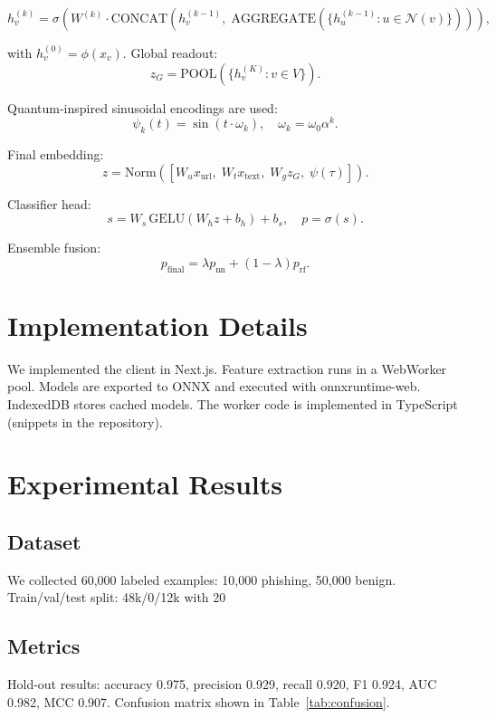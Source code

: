 \documentclass[conference]{IEEEtran}
\begin{document}
\begin{equation}
\label{eq:gnn}
 h_v^{(k)} = \sigma\left( W^{(k)} \cdot \mathrm{CONCAT}\left(h_v^{(k-1)},\; \mathrm{AGGREGATE}\left(\{h_u^{(k-1)}: u\in\mathcal{N}(v)\}\right)\right)\right),
\end{equation}

with $h_v^{(0)}=\phi(x_v)$. Global readout:
\begin{equation}
 z_G = \mathrm{POOL}(\{h_v^{(K)}: v\in V\}).
\end{equation}

Quantum-inspired sinusoidal encodings are used:
\begin{equation}
 \psi_k(t) = \sin(t\cdot\omega_k),\quad \omega_k=\omega_0\alpha^k.
\end{equation}

Final embedding:
\begin{equation}
 z = \mathrm{Norm}([W_u x_{\text{url}},\; W_t x_{\text{text}},\; W_g z_G,\; \psi(\tau)]).
\end{equation}

Classifier head:
\begin{equation}
 s = W_s\,\mathrm{GELU}(W_h z + b_h) + b_s,\quad p = \sigma(s).
\end{equation}

Ensemble fusion:
\begin{equation}
 p_{\text{final}} = \lambda p_{\text{nn}} + (1-\lambda) p_{\text{rf}}.
\end{equation}

\section{Implementation Details}
We implemented the client in Next.js. Feature extraction runs in a WebWorker pool. Models are exported to ONNX and executed with onnxruntime-web. IndexedDB stores cached models. The worker code is implemented in TypeScript (snippets in the repository).

\section{Experimental Results}
\subsection{Dataset}
We collected 60,000 labeled examples: 10,000 phishing, 50,000 benign. Train/val/test split: 48k/0/12k with 20%

\subsection{Metrics}
Hold-out results: accuracy 0.975, precision 0.929, recall 0.920, F1 0.924, AUC 0.982, MCC 0.907. Confusion matrix shown in Table~\ref{tab:confusion}.
\end{document}
